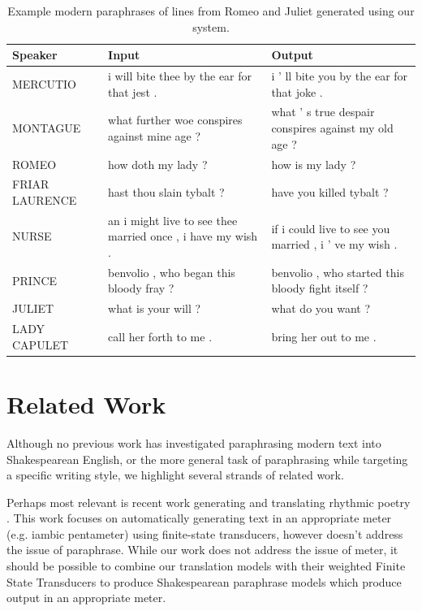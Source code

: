 \documentclass[10pt,a5paper,twoside]{article}
\begin{document}
\begin{table}
  \begin{center}
  \begin{tabular}{|l|p{1.8in}|p{1.8in}|}
    \hline
    Speaker & Input & Output \\
    \hline
    \hline
    MERCUTIO & i will bite thee by the ear for that jest . & i ’ ll bite you by the ear for that joke . \\
    \hline
    MONTAGUE & what further woe conspires against mine age ? & what ’ s true despair conspires against my old age ? \\
    \hline
    ROMEO & how doth my lady ? & how is my lady ? \\
    \hline
    FRIAR LAURENCE & hast thou slain tybalt ? & have you killed tybalt ? \\
    \hline
    NURSE & an i might live to see thee married once , i have my wish . & if i could live to see you married , i ’ ve my wish . \\
    \hline
    PRINCE & benvolio , who began this bloody fray ? & benvolio , who started this bloody fight itself ? \\
    \hline
    JULIET & what is your will ? & what do you want ? \\
    \hline
    LADY CAPULET & call her forth to me . & bring her out to me . \\
    \hline
  \end{tabular}
  \end{center}
  \caption{Example modern paraphrases of lines from Romeo and Juliet generated using our system.}
  \label{modern_examples}
\end{table}

\section{Related Work}
Although no previous work has investigated paraphrasing modern text into Shakespearean English, or the more general task of paraphrasing while targeting a specific writing
style, we highlight several strands of related work.

Perhaps most relevant is recent work generating and translating rhythmic poetry \cite{Greene10}.  This work focuses on automatically generating text in an appropriate
meter (e.g. iambic pentameter) using finite-state transducers, however doesn't address the issue of paraphrase.  
While our work does not address the issue of meter, it should be possible to combine our translation
models with their weighted Finite State Transducers to produce Shakespearean paraphrase models which produce output in an appropriate meter.
\end{document}
